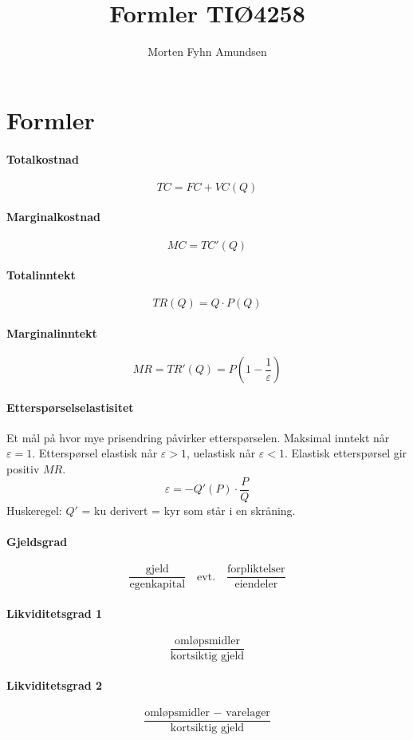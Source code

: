\documentclass[a4paper]{article}
\title{Formler TIØ4258}
\author{Morten Fyhn Amundsen}
\affil{NTNU}
\newcommand{\textfrac}[2]{\frac{\text{#1}}{\text{#2}}}
\begin{document}
\maketitle

\section{Formler}
\paragraph{Totalkostnad} $$TC = FC + VC(Q)$$
\paragraph{Marginalkostnad} $$MC = TC'(Q)$$
\paragraph{Totalinntekt} $$TR(Q) = Q \cdot P(Q)$$
\paragraph{Marginalinntekt} $$MR = TR'(Q) = P\left(1-\frac{1}{\varepsilon}\right)$$
\paragraph{Etterspørselselastisitet} Et mål på hvor mye prisendring påvirker etterspørselen. Maksimal inntekt når $\varepsilon = 1$. Etterspørsel elastisk når $\varepsilon > 1$, uelastisk når $\varepsilon < 1$.
Elastisk etterspørsel gir positiv $MR$.
$$\varepsilon = -Q'(P) \cdot \frac{P}{Q}$$
Huskeregel: $Q'$ = ku derivert = kyr som står i en skråning.
\paragraph{Gjeldsgrad} $$\textfrac{gjeld}{egenkapital} \quad\text{evt.}\quad \textfrac{forpliktelser}{eiendeler}$$
\paragraph{Likviditetsgrad 1} $$\textfrac{omløpsmidler}{kortsiktig gjeld}$$
\paragraph{Likviditetsgrad 2} $$\textfrac{omløpsmidler $-$ varelager}{kortsiktig gjeld}$$
\end{document}
